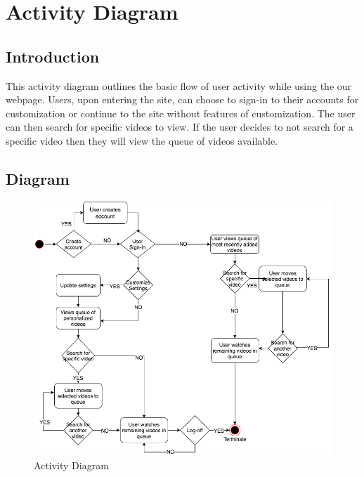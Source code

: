 \chapter{Activity Diagram}

\section{Introduction}
This activity diagram outlines the basic flow of user activity while using the our webpage. Users, upon entering the site, can choose to sign-in to their accounts for customization or continue to the site without features of customization. The user can then search for specific videos to view. If the user decides to not search for a specific video then they will view the queue of videos available.\newpage
\section{Diagram}
\begin{figure}[!ht]
      \centering
      \includegraphics[width=\textwidth]{activityDiagram}
      \caption{Activity Diagram}	
\end{figure}